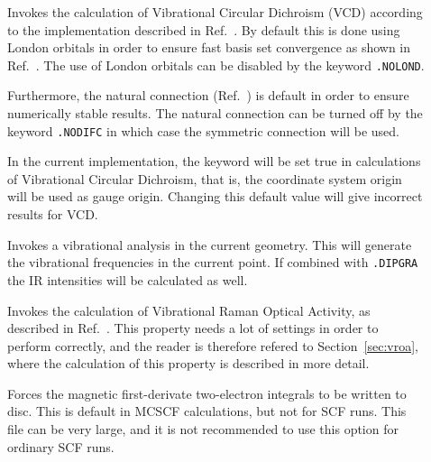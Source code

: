\begin{description}
\item[] Invokes the calculation of Vibrational Circular
Dichroism (VCD)
according to the implementation described in 
Ref.~\cite{klbpjthkrhjajjcp98}.  By default this is done using London
orbitals in order to 
ensure fast basis set convergence as shown in
Ref.~\cite{klbpjthkrhjajjcp100}. The use of London
orbitals can be disabled by the keyword \verb|.NOLOND|.

Furthermore, the natural connection
(Ref.~\cite{joklbkrthpjtca90,krthjopjklbcpl235}) is default in order to ensure
numerically stable results. The natural
connection can be turned off by the keyword \verb|.NODIFC| in which
case the symmetric connection will be used.


In the current implementation, the keyword  will be set
true in calculations of Vibrational Circular Dichroism, that is, the
coordinate system origin will be used as gauge origin. Changing this
default value will give incorrect results for VCD.


\item[] Invokes a vibrational analysis in the current
geometry. This will generate the vibrational frequencies in the
current point. If combined with \verb|.DIPGRA| the IR intensities
will be calculated as well. 

\item[] Invokes the calculation of Vibrational Raman
Optical Activity, as
described in Ref.~\cite{thkrklbpjjofd99}. This 
property needs a lot of settings in order to perform correctly, and
the reader is therefore refered to Section~\ref{sec:vroa}, where the
calculation of this property is described in more detail.

\item[] Forces the magnetic first-derivate two-electron
integrals to be written to disc. This is default in MCSCF
calculations, but not for SCF runs. This file can be very large, and
it is not recommended to use this option for ordinary SCF runs.

\end{description}


